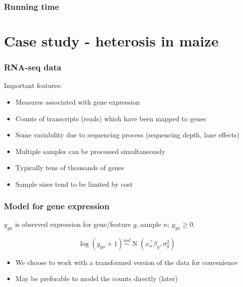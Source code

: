\documentclass{beamer}
\newcommand{\op}{\operatorname}
\newcommand{\ind}{\stackrel{ind}{\sim}}
\begin{document}
\begin{frame}
\frametitle{Running time}
\end{frame}



\section{Case study - heterosis in maize}


\begin{frame}
\frametitle{RNA-seq data}

Important features:
  
  \begin{itemize}
\item Measures associated with gene expression
\item Counts of transcripts (reads) which have been mapped to genes
\item Some variability due to sequencing process (sequencing depth, lane effects)
\item Multiple samples can be processed simultaneously
\item Typically tens of thousands of genes
\item Sample sizes tend to be limited by cost

\end{itemize}
\vspace{1cm}
{\small \citep{datta2014}}
\end{frame}



\begin{frame}
\frametitle{Model for gene expression}
$y_{gn}$ is observed expression for gene/feature $g$, sample $n$; $y_{gn} \ge 0$.

\[\log(y_{gn}+1) \ind \op{N}\left(x_{n}^\top\beta_g, \sigma^2_g\right) \]

\begin{itemize}
\item We choose to work with a transformed version of the data for convenience

\item May be preferable to model the counts directly (later)
\end{itemize}
\end{frame}
\end{document}
